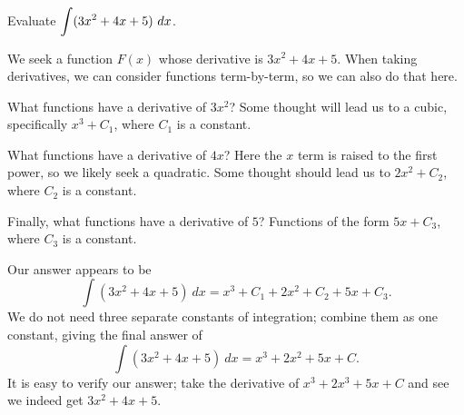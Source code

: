 \begin{example}
Evaluate $\ds \int (3x^2 + 4x+5)\ dx$. 

\solution We seek a function $F(x)$ whose derivative is $3x^2+4x+5$. When taking derivatives, we can consider functions term-by-term, so we can also do that here.

What functions have a derivative of $3x^2$? Some thought will lead us to a cubic, specifically $x^3+C_1$, where $C_1$ is a constant. 

What functions have a derivative of $4x$? Here the $x$ term is raised to the first power, so we likely seek a quadratic. Some thought should lead us to $2x^2+C_2$, where $C_2$ is a constant.

Finally, what functions have a derivative of $5$? Functions of the form $5x+C_3$, where $C_3$ is a constant.

Our answer appears to be 
\[ \int (3x^2+4x+5)\ dx = x^3+C_1+2x^2+C_2+5x+C_3.\]
We do not need three separate constants of integration; combine them as one constant, giving the final answer of 
\[ \int (3x^2+4x+5)\ dx = x^3+2x^2+5x+C.\]
It is easy to verify our answer; take the derivative of $x^3+2x^3+5x+C$ and see we indeed get $3x^2+4x+5$.
\end{example}